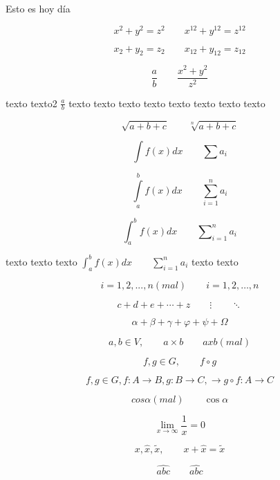 \documentclass[12pt,a4paper]{report}
\numberwithin{equation}{section}
\begin{document}
Esto es hoy día

$$
x^2+y^2=z^2\qquad x^{12}+y^{12}=z^{12}
$$

$$
x_2+y_2=z_2\qquad x_{12}+y_{12}=z_{12}
$$

$$
\frac{a}{b}\qquad\frac{x^2+y^2}{z^2}
$$

texto texto2 $\frac{a}{b}$ texto texto texto texto texto texto texto texto %

$$
\sqrt{a+b+c}\qquad \sqrt[n]{a+b+c}
$$

$$
\int f(x)dx \qquad \sum  a_i
$$

$$
\int\limits_{a}^{b} f(x)dx \qquad \sum_{i=1}^n a_i
$$

$$
\int_{a}^{b} f(x)dx \qquad \sum\nolimits_{i=1}^n a_i %
$$


texto texto texto $\int_{a}^{b} f(x) dx \qquad \sum_{i=1}^n a_i$ texto texto 

$$
i=1,2,...,n (mal)\qquad i=1,2,\ldots,n%
$$

$$
c+d+e+\cdots+z \qquad \vdots\qquad \ddots%
$$

$$
\alpha+\beta+\gamma+\varphi+\psi+\Omega%
$$

$$
a, b \in V,\qquad a\times b\qquad axb(mal)
$$

$$
f,g\in G ,\qquad f\circ g %
$$

$$
f,g \in G, f\colon A\to B, g:B\longrightarrow C,
\longrightarrow g\circ f:A\rightarrow C
$$

$$
cos\alpha (mal) \qquad \cos\alpha
$$

$$
\lim_{x\to\infty}\frac{1}{x}=0
$$


$$
x,\hat{x},\tilde{x},\qquad x+\hat{x}=\tilde{x}
$$


$$
\hat{abc}\qquad \widehat{abc}
$$
\end{document}
